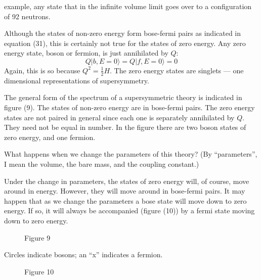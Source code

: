 
example, any state that in the infinite volume limit goes over to a
configuration of 92 neutrons.

Although the states of non-zero energy form bose-fermi pairs
as indicated in equation (31), this is certainly not true for the
states of zero energy. Any zero energy state, boson or fermion, is
just annihilated by $Q$:
\begin{equation}
Q|b, E = 0\rangle = Q|f, E = 0\rangle = 0
\tag{33}
\end{equation}
Again, this is so because $Q^2 = \frac{1}{2} H$. The zero energy states are
singlets --- one dimensional representations of supersymmetry.

The general form of the spectrum of a supersymmetric theory is
indicated in figure (9). The states of non-zero energy are in bose-fermi
pairs. The zero energy states are not paired in general since
each one is separately annihilated by $Q$. They need not be equal in
number. In the figure there are two boson states of zero energy,
and one fermion.

What happens when we change the parameters of this theory?
(By ``parameters'', I mean the volume,
the bare mass, and the coupling
constant.)

Under the change in parameters,
the states of zero energy will, of
course, move around in energy.
However, they will move around in
bose-fermi pairs. It may happen
that as we change the parameters a
bose state will move down to zero
energy. If so, it will always be
accompanied (figure (10)) by a
fermi state moving down to zero
energy.

\begin{figure}[h]
\centering

\caption*{Figure 9}
\end{figure}

Circles indicate bosons; an ``x''
indicates a fermion.

\begin{figure}[h]
\centering

\caption*{Figure 10}
\end{figure}

